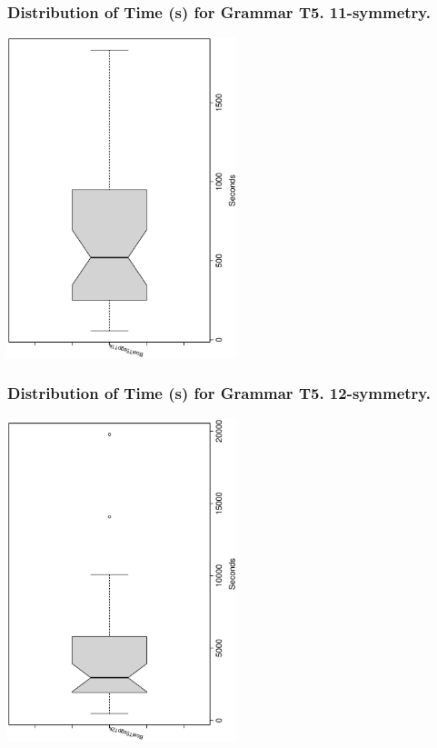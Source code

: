 \documentclass[18pt,c]{beamer}
\begin{document}
 \begin{frame}
 \frametitle{ Distribution of Time (s) for Grammar T5. 11-symmetry. }
 \begin{center}
\includegraphics[width=0.5\textwidth, angle=-90]
{ExpFboxplottSeconds009.eps}
 \end{center}
 \label{ExpFboxplottSeconds009.eps}  
 \end{frame}

 \begin{frame}
 \frametitle{ Distribution of Time (s) for Grammar T5. 12-symmetry. }
 \begin{center}
\includegraphics[width=0.5\textwidth, angle=-90]
{ExpFboxplottSeconds010.eps}
 \end{center}
 \label{ExpFboxplottSeconds010.eps}  
 \end{frame}
\end{document}
